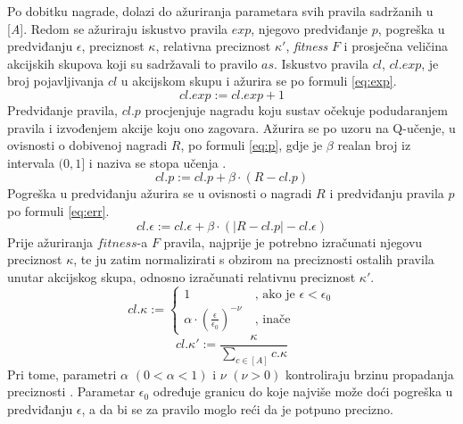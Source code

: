 \documentclass[times, utf8, zavrsni]{fer}
\begin{document}
Po dobitku nagrade, dolazi do ažuriranja parametara svih pravila sadržanih u [\emph{A}].
Redom se ažuriraju iskustvo pravila  $exp$, njegovo predviđanje  $p$, pogreška u predviđanju  $\epsilon$, preciznost  $\kappa$, relativna preciznost  $\kappa'$, \emph{fitness} $F$ i prosječna veličina akcijskih skupova koji su sadržavali to pravilo  $as$.
Iskustvo pravila $cl$, $cl.exp$, je broj pojavljivanja $cl$ u akcijskom skupu i ažurira se po formuli \eqref{eq:exp}.
\begin{equation}
\label{eq:exp}
cl.exp := cl.exp + 1
\end{equation}
Predviđanje pravila, $cl.p$ procjenjuje nagradu koju sustav očekuje podudaranjem pravila i izvođenjem akcije koju ono zagovara.
Ažurira se po uzoru na Q-učenje, u ovisnosti o dobivenoj nagradi $R$, po formuli \eqref{eq:p}, gdje je $\beta$ realan broj iz intervala $(0, 1]$ i naziva se stopa učenja .
\begin{equation}
\label{eq:p}
cl.p := cl.p + \beta \cdot (R - cl.p)
\end{equation}
Pogreška u predviđanju ažurira se u ovisnosti o nagradi $R$ i predviđanju pravila $p$ po formuli \eqref{eq:err}.
\begin{equation}
\label{eq:err}
cl.\epsilon := cl.\epsilon + \beta \cdot (|R - cl.p| - cl.\epsilon)
\end{equation}
Prije ažuriranja $fitness$-a $F$ pravila, najprije je potrebno izračunati njegovu preciznost $\kappa$, te ju zatim normalizirati s obzirom na preciznosti ostalih pravila unutar akcijskog skupa, odnosno izračunati relativnu preciznost $\kappa'$.
\begin{equation}
\label{eq:acc}
cl.\kappa :=
\begin{cases}
1 &\ \mbox{, ako je } \epsilon < \epsilon_{0} \\
\alpha \cdot \left( \frac{\epsilon}{\epsilon_{0}} \right)^{-\nu} &\ \mbox{, inače}
\end{cases}
\end{equation}
\begin{equation}
\label{eq:racc}
cl.\kappa' := \frac{\kappa}{\sum_{c \in [A]} c.\kappa}
\end{equation}
Pri tome, parametri $\alpha$ $(0 < \alpha < 1)$ i $\nu$ $(\nu > 0)$ kontroliraju brzinu propadanja preciznosti \citep{5}.
Parametar $\epsilon_{0}$ određuje granicu do koje najviše može doći pogreška u predviđanju $\epsilon$, a da bi se za pravilo moglo reći da je potpuno precizno.
\end{document}
